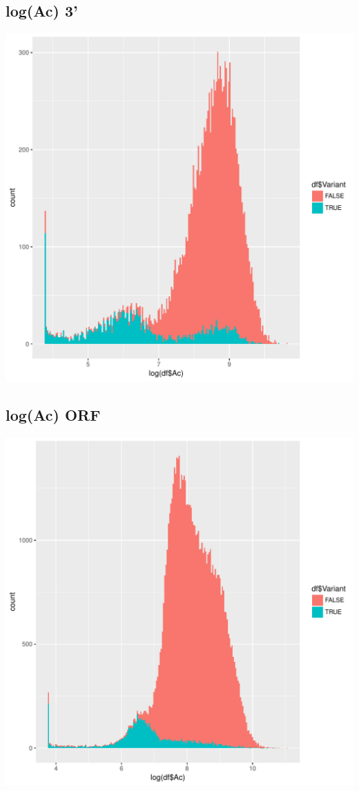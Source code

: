\documentclass{article}\usepackage[]{graphicx}\usepackage[]{color}
\newenvironment{knitrout}{}{} %
\begin{document}
\subsection{log(Ac) 3'}
\begin{knitrout}
\color{fgcolor}
\includegraphics[width=1\linewidth]{figure/dens_3-1} 

\end{knitrout}
\clearpage
\subsection{log(Ac) ORF}
\begin{knitrout}
\color{fgcolor}
\includegraphics[width=1\linewidth]{figure/dens_ORF-1} 

\end{knitrout}
\clearpage
\end{document}
